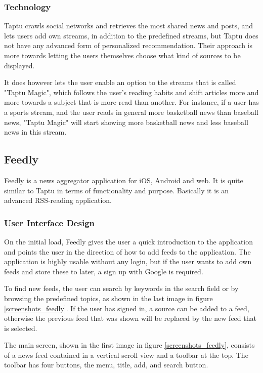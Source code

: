 \subsubsection{Technology}
Taptu crawls social networks and retrieves the most shared news and posts, and lets users add own streams, in addition to the predefined streams, but Taptu does not have any advanced form of personalized recommendation. Their approach is more towards letting the users themselves choose what kind of sources to be displayed.

It does however lets the user enable an option to the streams that is called "Taptu Magic", which follows the user's reading habits and shift articles more and more towards a subject that is more read than another\cite{taptu_magic}. For instance, if a user has a sports stream, and the user reads in general more basketball news than baseball news, "Taptu Magic" will start showing more basketball news and less baseball news in this stream.

\subsection{Feedly}
Feedly is a news aggregator application for iOS, Android and web. It is quite similar to Taptu in terms of functionality and purpose. Basically it is an advanced RSS-reading application.

\subsubsection{User Interface Design}
On the initial load, Feedly gives the user a quick introduction to the application and points the user in the direction of how to add feeds to the application. The application is highly usable without any login, but if the user wants to add own feeds and store these to later, a sign up with Google is required.

To find new feeds, the user can search by keywords in the search field or by browsing the predefined topics, as shown in the last image in figure \ref{screenshots_feedly}. If the user has signed in, a source can be added to a feed, otherwise the previous feed that was shown will be replaced by the new feed that is selected.

The main screen, shown in the first image in figure \ref{screenshots_feedly}, consists of a news feed contained in a vertical scroll view and a toolbar at the top. The toolbar has four buttons, the menu, title, add, and search button. 

